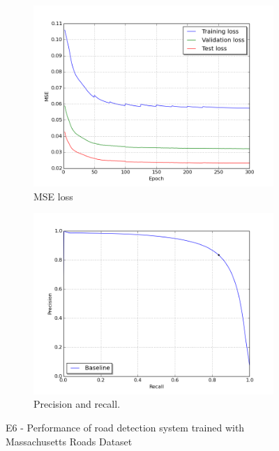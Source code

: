 \begin{figure}[!ht]
\begin{subfigure}{0.48\textwidth}
\includegraphics[width=\linewidth]{figs/E6/E6_lc_loss.png}
\caption{MSE loss} \label{fig:E6_performance_mass_lc}
\end{subfigure}
\hspace*{\fill} %
\begin{subfigure}{0.48\textwidth}
\includegraphics[width=\linewidth]{figs/E6/E6_pr.png}
\caption{Precision and recall.} \label{fig:E6_performance_mass_pr}
\end{subfigure}
\hspace*{\fill} %
\caption{E6 - Performance of road detection system trained with Massachusetts Roads Dataset} \label{fig:E6_performance_mass}
\end{figure}

